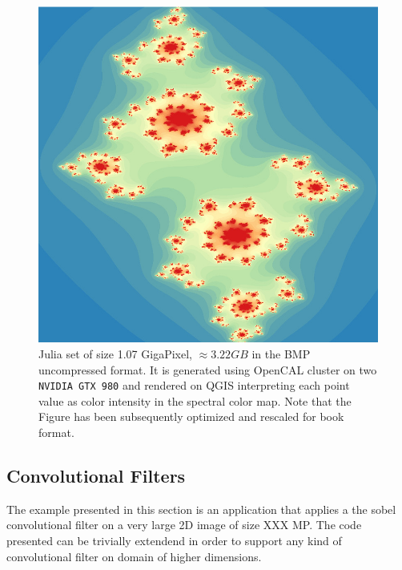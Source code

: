  \begin{figure}[H]
	\begin{center}
		\includegraphics[scale=0.35]{./images/opencal/fractal16k16k}
		\caption{Julia set of size 1.07 GigaPixel, $\approx 3.22 GB$ in the BMP uncompressed format. It is generated using OpenCAL cluster on two \texttt{NVIDIA GTX 980} and rendered on QGIS \cite{QGIS_software} interpreting each point value as color intensity in the spectral color map. Note that the Figure has been subsequently optimized and rescaled for book format.}
		\label{fig:fractal16k16k}
	\end{center}
\end{figure}

\subsection{Convolutional Filters}
The example presented in this section is an application that applies a the sobel convolutional filter on a very large 2D image of size XXX MP. The code presented can be trivially extendend in order to support any kind of convolutional filter on domain of higher dimensions.

